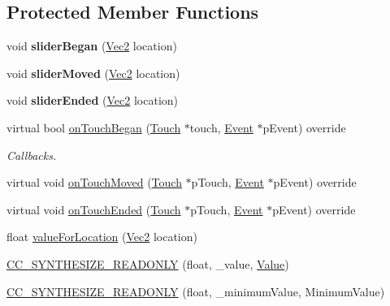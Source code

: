 \subsection*{Protected Member Functions}
\begin{DoxyCompactItemize}
\item 
\mbox{\label{classControlSlider_ab7ced3d412aaea1f04c1a8e764e94f37}} 
void {\bfseries slider\+Began} (\hyperlink{classVec2}{Vec2} location)
\item 
\mbox{\label{classControlSlider_a97b7201da57617902fc4202426b19958}} 
void {\bfseries slider\+Moved} (\hyperlink{classVec2}{Vec2} location)
\item 
\mbox{\label{classControlSlider_a20234c7f10be56751ffd842dd8fdcaa5}} 
void {\bfseries slider\+Ended} (\hyperlink{classVec2}{Vec2} location)
\item 
virtual bool \hyperlink{classControlSlider_a8f6fb619bb23b4e1507f1f2bb904f808}{on\+Touch\+Began} (\hyperlink{classTouch}{Touch} $\ast$touch, \hyperlink{classEvent}{Event} $\ast$p\+Event) override
\begin{DoxyCompactList}\small\item\em Callbacks. \end{DoxyCompactList}\item 
virtual void \hyperlink{classControlSlider_adc06e1f4b54e0f72c9359c111b6913ff}{on\+Touch\+Moved} (\hyperlink{classTouch}{Touch} $\ast$p\+Touch, \hyperlink{classEvent}{Event} $\ast$p\+Event) override
\item 
virtual void \hyperlink{classControlSlider_acdda8fa6365ab06db757c0a525c5108e}{on\+Touch\+Ended} (\hyperlink{classTouch}{Touch} $\ast$p\+Touch, \hyperlink{classEvent}{Event} $\ast$p\+Event) override
\item 
float \hyperlink{classControlSlider_a0b368f5f16a815ecdf027252ef3f88e6}{value\+For\+Location} (\hyperlink{classVec2}{Vec2} location)
\item 
\hyperlink{classControlSlider_a401fdf5a876cab98a1fdf9336ce27a17}{C\+C\+\_\+\+S\+Y\+N\+T\+H\+E\+S\+I\+Z\+E\+\_\+\+R\+E\+A\+D\+O\+N\+LY} (float, \+\_\+value, \hyperlink{classValue}{Value})
\item 
\hyperlink{classControlSlider_aad88e5f7129edc55c8417893d90386ec}{C\+C\+\_\+\+S\+Y\+N\+T\+H\+E\+S\+I\+Z\+E\+\_\+\+R\+E\+A\+D\+O\+N\+LY} (float, \+\_\+minimum\+Value, Minimum\+Value)
\item 

\end{DoxyCompactItemize}
